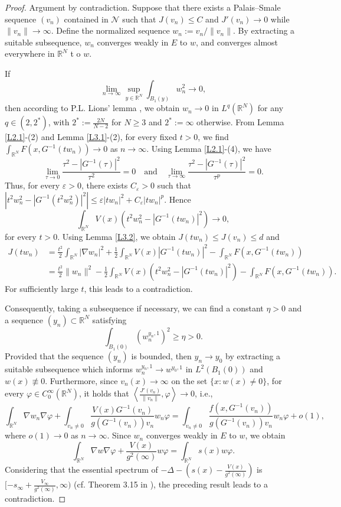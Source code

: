 \documentclass[reqno]{amsart}
\begin{document}
\begin{proof}
Argument by contradiction. Suppose that there exists a Palais–Smale sequence \((v_n)\) 
contained in \(\mathcal{N}\) such that \(J(v_n)\le C\) and \(J'(v_n)\to0\) while \(\|v_n\|\to\infty\). 
Define the normalized sequence \(w_n := v_n/\|v_n\|\). By extracting a suitable subsequence, 
\(w_n\) converges weakly in \(E\) to  \(w\), and converges almost everywhere in \(\mathbb{R}^N\) t
o $w$.

If
$$
\lim_{n\to\infty}\sup_{y\in{\mathbb{R}^N}}\int_{B_1(y)}w^2_n\to 0,
$$
then according to P.L. Lions' lemma \cite[p.16]{Willem}, 
 we obtain $w_n\to 0$ in $L^q({\mathbb{R}^N})$ for any $q\in (2, 2^*)$, with $2^*:= \frac{2N}{N-2}$ for 
 $N \geq 3$ and $2^* := \infty$ otherwise. 
 From Lemma \ref{L2.1}-(2) and Lemma \ref{L3.1}-(2),  for every fixed  $t>0$, we find 
 $\int_{\mathbb{R}^N}F(x,G^{-1}(t w_n))\to 0$ as $n\to\infty$. Using Lemma \ref{L2.1}-(4), we have
 $$
 \lim_{\tau\to 0}\frac{\tau^2-|G^{-1}(\tau)|^2}{\tau^2}=0\quad \text{and}\quad
 \lim_{\tau\to \infty}\frac{\tau^2-|G^{-1}(\tau)|^2}{\tau^p}=0.
 $$
Thus, for every $\varepsilon>0$, there exists $C_{\varepsilon}>0$ such that 
$\left|t^2w^2_n-|G^{-1}(t^2w^2_n)|^2\right|\leq \varepsilon |tw_n|^2+C_{\varepsilon}|tw_n|^p$. 
Hence $$\int_{\mathbb{R}^N}V(x)\left(t^2w^2_n-|G^{-1}(tw_n)|^2\right)\to 0,$$ for every $t>0$. 
Using Lemma \ref{L3.2}, we obtain $J(tw_n)\leq J(v_n)\leq d$ and
\begin{align*}
 J(tw_n)&= \frac{t^2}{2}\int_{\mathbb{R}^{N}}|\nabla w_n|^{2}
  +\frac{1}{2}\int_{\mathbb{R}^N}V(x)|G^{-1}(tw_n)|^2-\int_{\mathbb{R}^{N}}F(x,G^{-1}(tw_n)) \\
 &= \frac{t^2}{2}\|w_n\|^2-\frac{1}{2}\int_{\mathbb{R}^N}V(x)\left(t^2w^2_n-|G^{-1}(tw_n)|^2\right)
  -\int_{\mathbb{R}^{N}}F(x,G^{-1}(tw_n)).
\end{align*}
For sufficiently large $t$, this leads to a contradiction.

Consequently, taking a subsequence if necessary, we can find a constant $\eta > 0$ and a 
sequence $(y_n) \subset \mathbb{R}^N$ satisfying
$$
\int_{B_1(0)}(w_n^{y_n,1})^2\geq \eta>0.
$$
Provided that the sequence $(y_n)$ is bounded, then  $y_n\to y_0$ by extracting a suitable 
subsequence which informs $w_n^{y_n,1}\to w^{y_0,1}$ in $L^2(B_1(0))$ and 
$w(x) \not\equiv 0$. Furthermore, since $v_n(x) \to \infty$ on the set $\{x: w(x) \neq 0\}$, 
for every $\varphi \in C_0^{\infty}(\mathbb{R}^N)$, it holds that 
$\left\langle \frac{J'(v_n)}{\|v_n\|}, \varphi \right\rangle \to 0$, i.e.,
$$
\int_{\mathbb{R}^N}\nabla w_n\nabla\varphi+\int_{v_n
\neq 0}\frac{V(x)G^{-1}(v_n)}{g(G^{-1}(v_n))v_n}w_n\varphi
=\int_{v_n\neq 0}\frac{f(x,G^{-1}(v_n))}{g(G^{-1}(v_n))v_n}w_n\varphi+o(1),
$$
where $o(1)\to 0$ as $n\to\infty$.
Since \(w_n\) converges weakly in \(E\) to  \(w\), we obtain
$$
\int_{\mathbb{R}^N}\nabla w\nabla\varphi+\frac{V(x)}{g^2(\infty)}w\varphi=\int_{\mathbb{R}^N}s(x)w\varphi.
$$
Considering that the essential spectrum of $-\Delta-\left(s(x)-\frac{V(x)}{g^2(\infty)}\right)$ is 
$[-s_{\infty}+\frac{V_{\infty}}{g^2(\infty)},\infty)$ (cf. Theorem 3.15 in \cite{Stuart}),  
the preceding result leads to a contradiction.


\end{proof}
\end{document}
